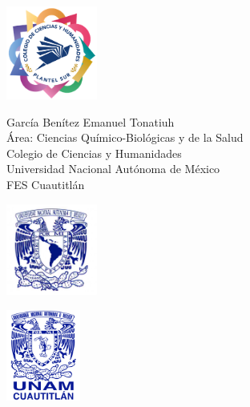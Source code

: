 \documentclass[11pt]{article}
\theoremstyle{mytheoremstyle}
\theoremstyle{mytheoremstyle}
\theoremstyle{myproblemstyle}
\begin{document}
\begin{titlepage}
\begin{center}
        \noindent
        \begin{minipage}[c]{0.2\textwidth}
            \centering
            \includegraphics[width=3cm]{img/cch.png}
        \end{minipage}
        \hfill
        \begin{minipage}[c]{0.55\textwidth}
            \centering
            {\large García Benítez Emanuel Tonatiuh}\\[0.5cm]
            {\large Área: Ciencias Químico-Biológicas y de la Salud}\\[0.5cm]
            {\large Colegio de Ciencias y Humanidades}\\
            {\large Universidad Nacional Autónoma de México}\\
            {\large FES Cuautitlán}\\
        \end{minipage}
        \vspace{2cm}
        \hfill
        \begin{minipage}[c]{0.2\textwidth}
            \centering
            \includegraphics[width=3.0cm]{img/UNAM.jpg}
        \end{minipage}
        \includegraphics[height=3cm]{img/logo-FESC.png}
    \end{center}
    \vfill %
\end{titlepage}

\setcounter{page}{1} %

\end{document}
